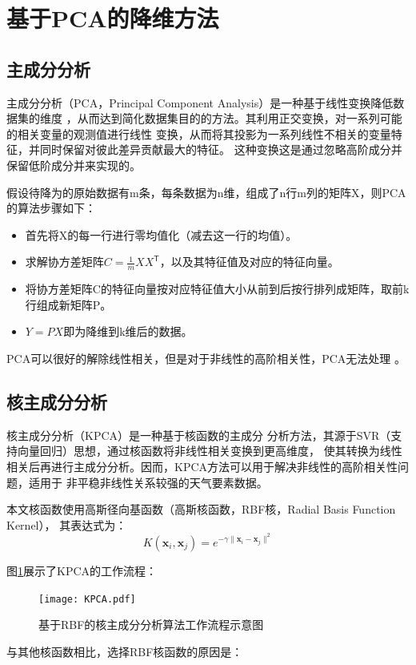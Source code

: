 \documentclass[AutoFakeBold]{LZUThesis}
\begin{document}
\section{基于PCA的降维方法}
\subsection{主成分分析}
主成分分析（PCA，Principal Component Analysis）是一种基于线性变换降低数据集的维度
，从而达到简化数据集目的的方法。其利用正交变换，对一系列可能的相关变量的观测值进行线性
变换，从而将其投影为一系列线性不相关的变量特征，并同时保留对彼此差异贡献最大的特征。
这种变换这是通过忽略高阶成分并保留低阶成分并来实现的。

假设待降为的原始数据有m条，每条数据为n维，组成了n行m列的矩阵X，则PCA的算法步骤如下：

\begin{itemize}
    \item 首先将X的每一行进行零均值化（减去这一行的均值）。
    \item 求解协方差矩阵$C=\frac{1}{m}XX^\mathsf{T}$，以及其特征值及对应的特征向量。
    \item 将协方差矩阵C的特征向量按对应特征值大小从前到后按行排列成矩阵，取前k行组成新矩阵P。
    \item $Y=PX$即为降维到k维后的数据。
\end{itemize}
PCA可以很好的解除线性相关，但是对于非线性的高阶相关性，PCA无法处理
。

\subsection{核主成分分析}
核主成分分析（KPCA）是一种基于核函数的主成分
分析方法，其源于SVR（支持向量回归）思想，通过核函数将非线性相关变换到更高维度，
使其转换为线性相关后再进行主成分分析。因而，KPCA方法可以用于解决非线性的高阶相关性问题，适用于
非平稳非线性关系较强的天气要素数据。

本文核函数使用高斯径向基函数（高斯核函数，RBF核，Radial Basis Function Kernel），
其表达式为：
$$K(\mathbf x_i,\mathbf x_j)=e^{-\gamma\|\mathbf x_i-\mathbf x_j\|^2}$$

图\ref{fig_kpca}展示了KPCA的工作流程：
\begin{figure}[H]
    \centering
    \texttt{[image: KPCA.pdf]}
    \caption{基于RBF的核主成分分析算法工作流程示意图}
    \label{fig_kpca}
  \end{figure}

与其他核函数相比，选择RBF核函数的原因是：
\end{document}
